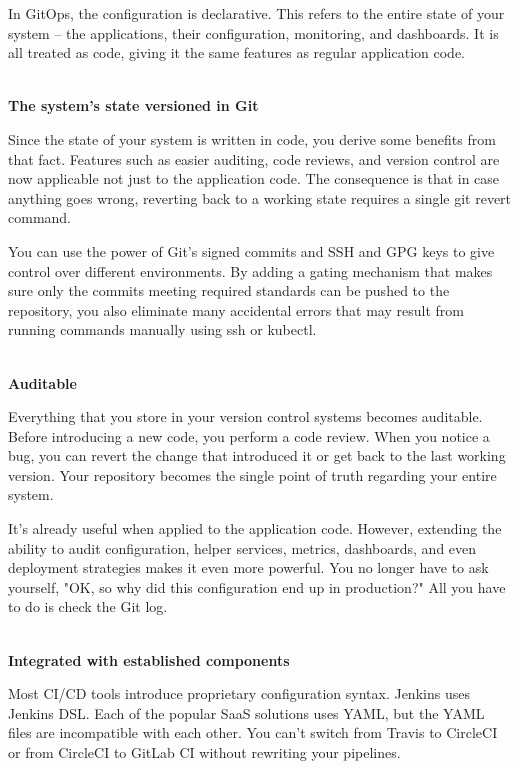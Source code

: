 In GitOps, the configuration is declarative. This refers to the entire state of your system – the applications, their configuration, monitoring, and dashboards. It is all treated as code, giving it the same features as regular application code.

\hspace*{\fill} \\ %
\noindent
\textbf{The system's state versioned in Git}

Since the state of your system is written in code, you derive some benefits from that fact. Features such as easier auditing, code reviews, and version control are now applicable not just to the application code. The consequence is that in case anything goes wrong, reverting back to a working state requires a single git revert command.

You can use the power of Git's signed commits and SSH and GPG keys to give control over different environments. By adding a gating mechanism that makes sure only the commits meeting required standards can be pushed to the repository, you also eliminate many accidental errors that may result from running commands manually using ssh or kubectl.

\hspace*{\fill} \\ %
\noindent
\textbf{Auditable}

Everything that you store in your version control systems becomes auditable. Before introducing a new code, you perform a code review. When you notice a bug, you can revert the change that introduced it or get back to the last working version. Your repository becomes the single point of truth regarding your entire system.

It's already useful when applied to the application code. However, extending the ability to audit configuration, helper services, metrics, dashboards, and even deployment strategies makes it even more powerful. You no longer have to ask yourself, "OK, so why did this configuration end up in production?" All you have to do is check the Git log.

\hspace*{\fill} \\ %
\noindent
\textbf{Integrated with established components}

Most CI/CD tools introduce proprietary configuration syntax. Jenkins uses Jenkins DSL. Each of the popular SaaS solutions uses YAML, but the YAML files are incompatible with each other. You can't switch from Travis to CircleCI or from CircleCI to GitLab CI without rewriting your pipelines.

